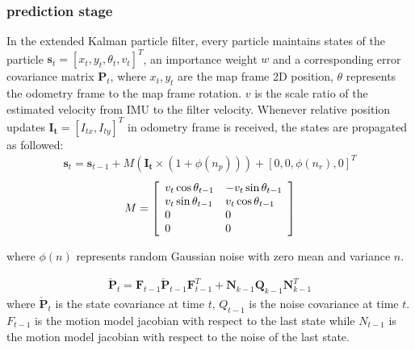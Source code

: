 \subsubsection{prediction stage} 
In the extended Kalman particle filter, every particle maintains states of the particle $\mathbf{s}_{t}=[x_t,y_t,\theta_t,v_t]^T$, an importance weight $w$ and a corresponding error covariance matrix $\mathbf{P}_{t}$, where $x_t,y_t$ are the map frame 2D position, $\theta$ represents the odometry frame to the map frame rotation. $v$ is the scale ratio of the estimated velocity from IMU to the filter velocity. Whenever relative position updates $\mathbf{I_{t}} = {[I_{tx},I_{ty}]^T}$ in odometry frame is received, the states are propagated as followed:
\begin{equation}
\begin{aligned}
\mathbf{s}_{t}=\mathbf{s}_{t-1}+M(\mathbf{I_{t}} \times (1+\phi(n_p))) + [0,0,\phi(n_r),0]^T 
\end{aligned}
\end{equation}
\begin{equation}
\begin{aligned}
M = {\left[\begin{array}{l l l}{v_t\cos\theta_{t-1}}&{-v_t\sin\theta_{t-1}}\\ {v_t\sin\theta_{t-1}}&{v_t\cos\theta_{t-1}}\\ {0}&{0}\\ {0}&{0}\end{array}\right]}
\end{aligned}
\end{equation}


where $\phi(n)$ represents random Gaussian noise with zero mean and variance $n$.


\begin{equation}
\begin{aligned}
\check{\mathbf{P}}_{t}=\mathbf{F}_{t-1}\check{\mathbf{P}}_{t-1}\mathbf{F}_{t-1}^{T}+\mathbf{N}_{k-1}\mathbf{Q}_{k-1}\mathbf{N}_{k-1}^{T}
\end{aligned}
\end{equation}
where $\check{\mathbf{P}}_{t}$ is the state covariance at time $t$, $Q_{t-1}$ is the noise covariance at time $t$. ${F}_{t-1}$ is the motion model jacobian with respect to the last state while ${N}_{t-1}$ is the motion model jacobian with respect to the noise of the last state. 


